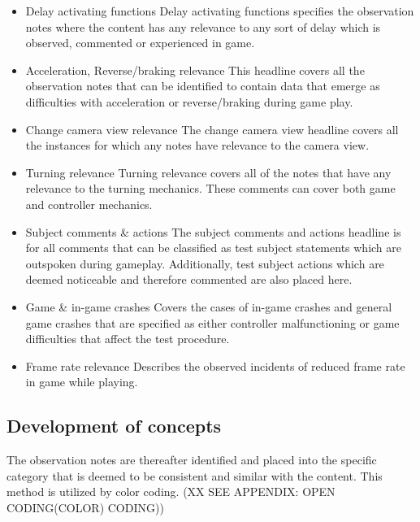 \begin{itemize}
	\item Delay activating functions\newline
		Delay activating functions specifies the observation notes where the content has any relevance to any sort of delay 			which is observed, commented or experienced in game.
	\item Acceleration, Reverse/braking relevance\newline
		This headline covers all the observation notes that can be identified to contain data that emerge as difficulties 				with acceleration or reverse/braking during game play. 
	\item Change camera view relevance\newline
		The change camera view headline covers all the instances for which any notes have relevance to the camera view.
	\item Turning relevance\newline
		Turning relevance covers all of the notes that have any relevance to the turning mechanics. These comments can cover 			both game and controller mechanics.
	\item Subject comments \& actions\newline
		The subject comments and actions headline is for all comments that can be classified as test subject statements which 		are outspoken during gameplay. Additionally, test subject actions which are deemed noticeable and therefore commented 		are also placed here.
	\item Game \& in-game crashes\newline
		Covers the cases of in-game crashes and general game crashes that are specified as either controller malfunctioning 			or game difficulties that affect the test procedure.
	\item Frame rate relevance\newline
		Describes the observed incidents of reduced frame rate in game while playing.
\end{itemize}


\subsection*{Development of concepts}
The observation notes are thereafter identified and placed into the specific category that is deemed to be consistent and similar with the content. This method is utilized by color coding. (XX SEE APPENDIX: OPEN CODING(COLOR) CODING))

